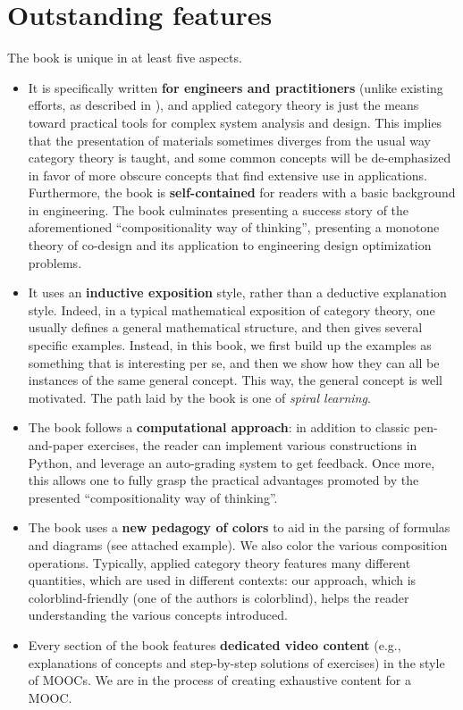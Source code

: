 \documentclass[10pt, article, one side]{memoir}
\begin{document}
    \section{Outstanding features}
    The book is unique in at least five aspects.
    \begin{itemize}
        \item It is specifically written \textbf{for engineers and practitioners} (unlike existing efforts, as described in ), and applied category theory is just the means toward practical tools for complex system analysis and design.
              This implies that the presentation of materials sometimes diverges from the usual way category theory is taught, and some common concepts will be de-emphasized in favor of more obscure concepts that find extensive use in applications.
              Furthermore, the book is \textbf{self-contained} for readers with a basic background in engineering.
              The book culminates presenting a success story of the aforementioned “compositionality way of thinking”, presenting a monotone theory of co-design and its application to engineering design optimization problems.
        \item It uses an \textbf{inductive exposition} style, rather than a deductive explanation style.
              Indeed, in a typical mathematical exposition of category theory, one usually defines a general mathematical structure, and then gives several specific examples.
              Instead, in this book, we first build up the examples as something that is interesting per se, and then we show how they can all be instances of the same general concept.
              This way, the general concept is well motivated.
              The path laid by the book is one of \emph{spiral learning}.
        \item The book follows a \textbf{computational approach}: in addition to classic pen-and-paper exercises, the reader can implement various constructions in Python, and leverage an auto-grading system to get feedback.
              Once more, this allows one to fully grasp the practical advantages promoted by the presented ``compositionality way of thinking''.
        \item The book uses a \textbf{new pedagogy of colors} to aid in the parsing of formulas and diagrams (see attached example).
              We also color the various composition operations.
              Typically, applied category theory features many different quantities, which are used in different contexts: our approach, which is colorblind-friendly (one of the authors is colorblind), helps the reader understanding the various concepts introduced.

              \begin{center}
              \end{center}
        \item Every section of the book features \textbf{dedicated video content} (e.g., explanations of concepts and step-by-step solutions of exercises) in the style of MOOCs.
              We are in the process of creating exhaustive content for a MOOC.
    \end{itemize}
\end{document}
